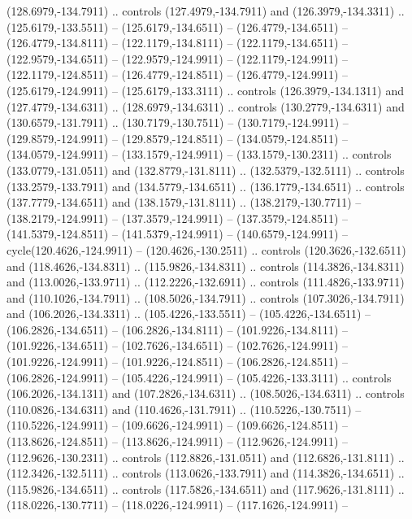 \begin{scope}[cm={{1.25,0.0,0.0,-1.25,(0.0,442.91375)}}]
\begin{scope}[xscale=1.000,yscale=-1.000,fill=c545457,line join=miter,line cap=butt,line width=0.800pt]
      (128.6979,-134.7911) .. controls (127.4979,-134.7911) and (126.3979,-134.3311)
      .. (125.6179,-133.5511) -- (125.6179,-134.6511) -- (126.4779,-134.6511) --
      (126.4779,-134.8111) -- (122.1179,-134.8111) -- (122.1179,-134.6511) --
      (122.9579,-134.6511) -- (122.9579,-124.9911) -- (122.1179,-124.9911) --
      (122.1179,-124.8511) -- (126.4779,-124.8511) -- (126.4779,-124.9911) --
      (125.6179,-124.9911) -- (125.6179,-133.3111) .. controls (126.3979,-134.1311)
      and (127.4779,-134.6311) .. (128.6979,-134.6311) .. controls
      (130.2779,-134.6311) and (130.6579,-131.7911) .. (130.7179,-130.7511) --
      (130.7179,-124.9911) -- (129.8579,-124.9911) -- (129.8579,-124.8511) --
      (134.0579,-124.8511) -- (134.0579,-124.9911) -- (133.1579,-124.9911) --
      (133.1579,-130.2311) .. controls (133.0779,-131.0511) and (132.8779,-131.8111)
      .. (132.5379,-132.5111) .. controls (133.2579,-133.7911) and
      (134.5779,-134.6511) .. (136.1779,-134.6511) .. controls (137.7779,-134.6511)
      and (138.1579,-131.8111) .. (138.2179,-130.7711) -- (138.2179,-124.9911) --
      (137.3579,-124.9911) -- (137.3579,-124.8511) -- (141.5379,-124.8511) --
      (141.5379,-124.9911) -- (140.6579,-124.9911) -- cycle(120.4626,-124.9911) --
      (120.4626,-130.2511) .. controls (120.3626,-132.6511) and (118.4626,-134.8311)
      .. (115.9826,-134.8311) .. controls (114.3826,-134.8311) and
      (113.0026,-133.9711) .. (112.2226,-132.6911) .. controls (111.4826,-133.9711)
      and (110.1026,-134.7911) .. (108.5026,-134.7911) .. controls
      (107.3026,-134.7911) and (106.2026,-134.3311) .. (105.4226,-133.5511) --
      (105.4226,-134.6511) -- (106.2826,-134.6511) -- (106.2826,-134.8111) --
      (101.9226,-134.8111) -- (101.9226,-134.6511) -- (102.7626,-134.6511) --
      (102.7626,-124.9911) -- (101.9226,-124.9911) -- (101.9226,-124.8511) --
      (106.2826,-124.8511) -- (106.2826,-124.9911) -- (105.4226,-124.9911) --
      (105.4226,-133.3111) .. controls (106.2026,-134.1311) and (107.2826,-134.6311)
      .. (108.5026,-134.6311) .. controls (110.0826,-134.6311) and
      (110.4626,-131.7911) .. (110.5226,-130.7511) -- (110.5226,-124.9911) --
      (109.6626,-124.9911) -- (109.6626,-124.8511) -- (113.8626,-124.8511) --
      (113.8626,-124.9911) -- (112.9626,-124.9911) -- (112.9626,-130.2311) ..
      controls (112.8826,-131.0511) and (112.6826,-131.8111) .. (112.3426,-132.5111)
      .. controls (113.0626,-133.7911) and (114.3826,-134.6511) ..
      (115.9826,-134.6511) .. controls (117.5826,-134.6511) and (117.9626,-131.8111)
      .. (118.0226,-130.7711) -- (118.0226,-124.9911) -- (117.1626,-124.9911) --

\end{scope}
\end{scope}
